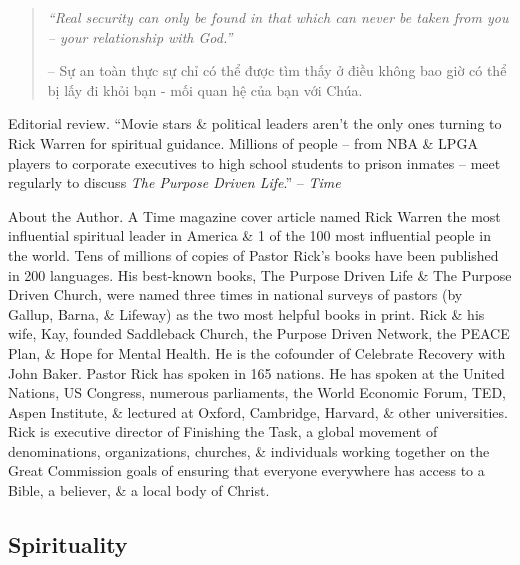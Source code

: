 \documentclass{article}
\begin{document}
\begin{enumerate}
\begin{quotation}
		{\it``Real security can only be found in that which can never be taken from you -- your relationship with God.''}
		
		-- Sự an toàn thực sự chỉ có thể được tìm thấy ở điều không bao giờ có thể bị lấy đi khỏi bạn - mối quan hệ của bạn với Chúa.
	\end{quotation}
	{\sf Editorial review.} ``Movie stars \& political leaders aren't the only ones turning to {\sc Rick Warren} for spiritual guidance. Millions of people -- from NBA \& LPGA players to corporate executives to high school students to prison inmates -- meet regularly to discuss {\it The Purpose Driven Life}.'' -- {\it Time}
	
	{\sf About the Author.} A Time magazine cover article named Rick Warren the most influential spiritual leader in America \& 1 of the 100 most influential people in the world. Tens of millions of copies of Pastor Rick's books have been published in 200 languages. His best-known books, The Purpose Driven Life \& The Purpose Driven Church, were named three times in national surveys of pastors (by Gallup, Barna, \& Lifeway) as the two most helpful books in print. Rick \& his wife, Kay, founded Saddleback Church, the Purpose Driven Network, the PEACE Plan, \& Hope for Mental Health. He is the cofounder of Celebrate Recovery with John Baker. Pastor Rick has spoken in 165 nations. He has spoken at the United Nations, US Congress, numerous parliaments, the World Economic Forum, TED, Aspen Institute, \& lectured at Oxford, Cambridge, Harvard, \& other universities. Rick is executive director of Finishing the Task, a global movement of denominations, organizations, churches, \& individuals working together on the Great Commission goals of ensuring that everyone everywhere has access to a Bible, a believer, \& a local body of Christ.	
\end{enumerate}


\subsection{Spirituality}
\end{document}
